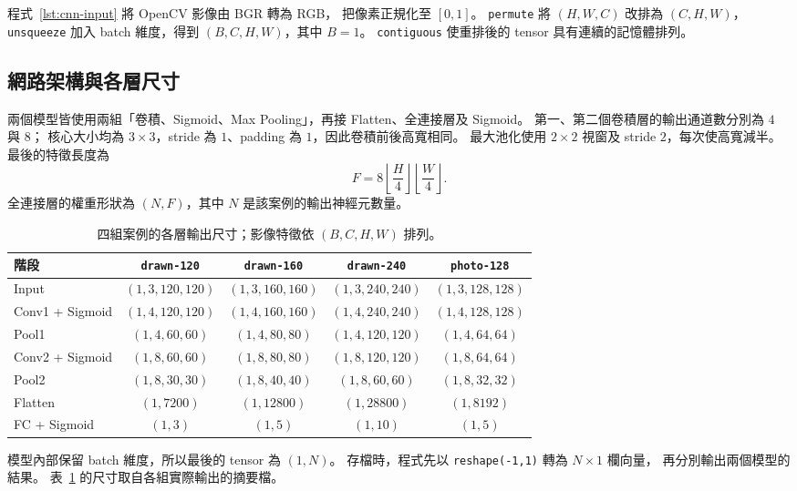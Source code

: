 程式~\ref{lst:cnn-input} 將 OpenCV 影像由 BGR 轉為 RGB，
把像素正規化至 $[0,1]$。
\texttt{permute} 將 $(H,W,C)$ 改排為 $(C,H,W)$，
\texttt{unsqueeze} 加入 batch 維度，得到 $(B,C,H,W)$，其中 $B=1$。
\texttt{contiguous} 使重排後的 tensor 具有連續的記憶體排列。

\subsection{網路架構與各層尺寸}

兩個模型皆使用兩組「卷積、Sigmoid、Max Pooling」，再接 Flatten、全連接層及 Sigmoid。
第一、第二個卷積層的輸出通道數分別為 $4$ 與 $8$；
核心大小均為 $3\times3$，stride 為 $1$、padding 為 $1$，因此卷積前後高寬相同。
最大池化使用 $2\times2$ 視窗及 stride $2$，每次使高寬減半。
最後的特徵長度為
\begin{equation}
  F=8\left\lfloor\frac{H}{4}\right\rfloor
       \left\lfloor\frac{W}{4}\right\rfloor.
  \label{eq:cnn-flatten}
\end{equation}
全連接層的權重形狀為 $(N,F)$，其中 $N$ 是該案例的輸出神經元數量。

\begin{table}[H]
  \centering
  \small
  \setlength{\tabcolsep}{3pt}
  \caption{四組案例的各層輸出尺寸；影像特徵依 $(B,C,H,W)$ 排列。}
  \label{tab:cnn-layer-shapes}
  \begin{tabular}{@{}lcccc@{}}
    \toprule
    階段 & \texttt{drawn-120} & \texttt{drawn-160} & \texttt{drawn-240} & \texttt{photo-128} \\
    \midrule
    Input & $(1,3,120,120)$ & $(1,3,160,160)$ & $(1,3,240,240)$ & $(1,3,128,128)$ \\
    Conv1 + Sigmoid & $(1,4,120,120)$ & $(1,4,160,160)$ & $(1,4,240,240)$ & $(1,4,128,128)$ \\
    Pool1 & $(1,4,60,60)$ & $(1,4,80,80)$ & $(1,4,120,120)$ & $(1,4,64,64)$ \\
    Conv2 + Sigmoid & $(1,8,60,60)$ & $(1,8,80,80)$ & $(1,8,120,120)$ & $(1,8,64,64)$ \\
    Pool2 & $(1,8,30,30)$ & $(1,8,40,40)$ & $(1,8,60,60)$ & $(1,8,32,32)$ \\
    Flatten & $(1,7200)$ & $(1,12800)$ & $(1,28800)$ & $(1,8192)$ \\
    FC + Sigmoid & $(1,3)$ & $(1,5)$ & $(1,10)$ & $(1,5)$ \\
    \bottomrule
  \end{tabular}
\end{table}

模型內部保留 batch 維度，所以最後的 tensor 為 $(1,N)$。
存檔時，程式先以 \texttt{reshape(-1,1)} 轉為 $N\times1$ 欄向量，
再分別輸出兩個模型的結果。
表~\ref{tab:cnn-layer-shapes} 的尺寸取自各組實際輸出的摘要檔。

